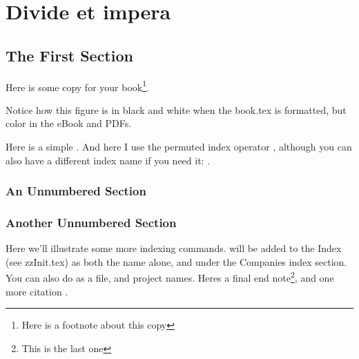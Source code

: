 \chapter{Divide et impera}
\label{abody}%

\section{The First Section}

Here is some copy for your book\footnote{Here is a footnote about this copy}.



Notice how this figure is in black and white when the book.tex is formatted, but color in the eBook and PDFs.

Here is a simple . And here I use the permuted index operator , although you can also have a different index name if you need it: .

\subsection*{An Unnumbered Section}

\lipsum[9-15]

\subsection*{Another Unnumbered Section}

\lipsum[16-22]

Here we'll illustrate some more indexing commands.  will be added to the Index (see zzInit.tex) as both the name alone,
and under the Companies index section. You can also do  as a file, and  project names. Heres a final end note\footnote{This is the last one}, and one more citation \cite{Pfister2013}.

